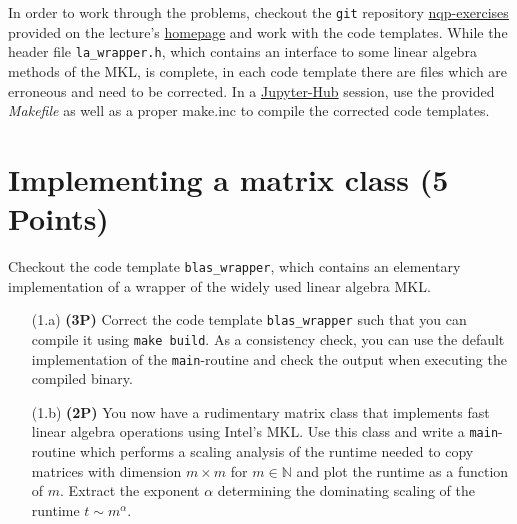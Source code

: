 \documentclass[a4paper, 12pt]{article}
\begin{document}
%
In order to work through the problems, checkout the \texttt{git} repository \href{git@gitlab.physik.uni-muenchen.de:nqp/nqp-exercises.git}{nqp-exercises} provided on the lecture's \href{https://www2.physik.uni-muenchen.de/lehre/vorlesungen/sose_23/nqp/uebungen/index.html}{homepage} and work with the code templates.
%
While the header file \texttt{la\_wrapper.h}, which contains an interface to some linear algebra methods of the MKL, is complete, in each code template there are files which are erroneous and need to be corrected.
%
In a \href{https://jupyter.physik.uni-muenchen.de}{Jupyter-Hub} session, use the provided \textit{Makefile} as well as a proper make.inc to compile the corrected code templates.
%

%
\section{Implementing a matrix class \textbf{(5 Points)}}
%
Checkout the code template \texttt{blas\_wrapper}, which contains an elementary implementation of a wrapper of the widely used linear algebra MKL.
%
\begin{itemize}
	\item[(1.a)] \textbf{(3P)}
	Correct the code template \texttt{blas\_wrapper} such that you can compile it using \texttt{make build}.
	As a consistency check, you can use the default implementation of the \texttt{main}-routine and check the output when executing the compiled binary.
	\item[(1.b)] \textbf{(2P)}
	You now have a rudimentary matrix class that implements fast linear algebra operations using Intel's MKL.
	Use this class and write a \texttt{main}-routine which performs a scaling analysis of the runtime needed to copy matrices with dimension $m \times m$ for $m\in\mathbb N$ and plot the runtime as a function of $m$.
	Extract the exponent $\alpha$ determining the dominating scaling of the runtime $t \sim m^\alpha$.
\end{itemize}
%

%
\end{document}
